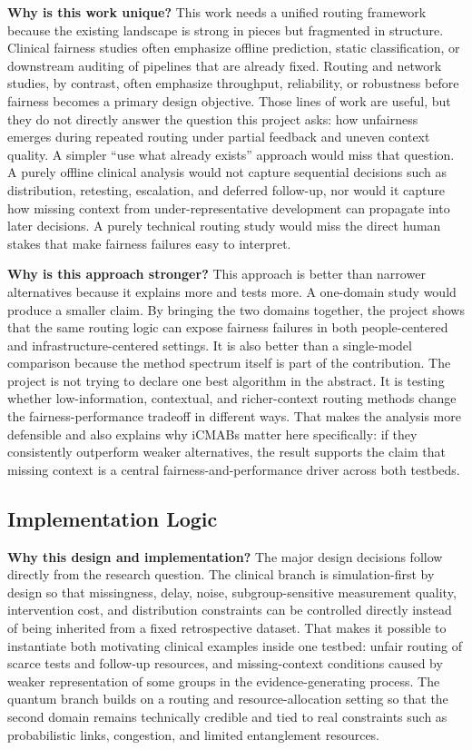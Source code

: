 \documentclass{IEEEtran}
\begin{document}
\noindent\textbf{Why is this work unique?} This work needs a unified routing framework because the existing landscape is strong in pieces but fragmented in structure. Clinical fairness studies often emphasize offline prediction, static classification, or downstream auditing of pipelines that are already fixed. Routing and network studies, by contrast, often emphasize throughput, reliability, or robustness before fairness becomes a primary design objective. Those lines of work are useful, but they do not directly answer the question this project asks: how unfairness emerges during repeated routing under partial feedback and uneven context quality. A simpler ``use what already exists'' approach would miss that question. A purely offline clinical analysis would not capture sequential decisions such as distribution, retesting, escalation, and deferred follow-up, nor would it capture how missing context from under-representative development can propagate into later decisions. A purely technical routing study would miss the direct human stakes that make fairness failures easy to interpret.

\noindent\textbf{Why is this approach stronger?} This approach is better than narrower alternatives because it explains more and tests more. A one-domain study would produce a smaller claim. By bringing the two domains together, the project shows that the same routing logic can expose fairness failures in both people-centered and infrastructure-centered settings. It is also better than a single-model comparison because the method spectrum itself is part of the contribution. The project is not trying to declare one best algorithm in the abstract. It is testing whether low-information, contextual, and richer-context routing methods change the fairness-performance tradeoff in different ways. That makes the analysis more defensible and also explains why iCMABs matter here specifically: if they consistently outperform weaker alternatives, the result supports the claim that missing context is a central fairness-and-performance driver across both testbeds.

\subsection*{Implementation Logic}
\noindent\textbf{Why this design and implementation?} The major design decisions follow directly from the research question. The clinical branch is simulation-first by design so that missingness, delay, noise, subgroup-sensitive measurement quality, intervention cost, and distribution constraints can be controlled directly instead of being inherited from a fixed retrospective dataset. That makes it possible to instantiate both motivating clinical examples inside one testbed: unfair routing of scarce tests and follow-up resources, and missing-context conditions caused by weaker representation of some groups in the evidence-generating process. The quantum branch builds on a routing and resource-allocation setting so that the second domain remains technically credible and tied to real constraints such as probabilistic links, congestion, and limited entanglement resources.
\end{document}
